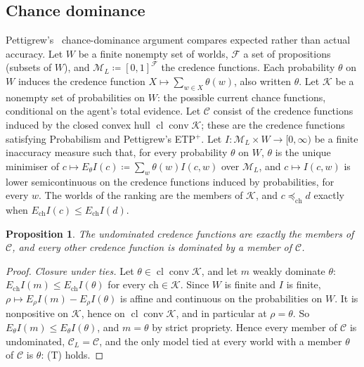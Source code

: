 \documentclass[11pt]{article}
\newtheorem{proposition}[theorem]{Proposition}
\theoremstyle{definition}
\newcommand{\M}{\mathcal M}
\newcommand{\C}{\mathcal C}
\begin{document}
{\color{red}
\subsection{Chance dominance}\label{sec:chance}
Pettigrew's~\cite[Chapter~10]{Pettigrew2016} chance-dominance argument compares expected rather than actual accuracy. Let $W$ be a finite nonempty set of worlds, $\mathcal F$ a set of propositions (subsets of $W$), and $\M_L\coloneqq[0,1]^{\mathcal F}$ the credence functions. Each probability $\theta$ on $W$ induces the credence function $X\mapsto\sum_{w\in X}\theta(w)$, also written $\theta$. Let $\mathcal K$ be a nonempty set of probabilities on $W$: the possible current chance functions, conditional on the agent's total evidence. Let $\C$ consist of the credence functions induced by the closed convex hull $\operatorname{cl}\operatorname{conv}\mathcal K$; these are the credence functions satisfying Probabilism and Pettigrew's ETP$^+$. Let $I:\M_L\times W\to[0,\infty)$ be a finite inaccuracy measure such that, for every probability $\theta$ on $W$, $\theta$ is the unique minimiser of $c\mapsto E_\theta I(c)\coloneqq\sum_w\theta(w)I(c,w)$ over $\M_L$, and $c\mapsto I(c,w)$ is lower semicontinuous on the credence functions induced by probabilities, for every $w$. The worlds of the ranking are the members of $\mathcal K$, and $c\preceq_{\mathrm{ch}}d$ exactly when $E_{\mathrm{ch}}I(c)\le E_{\mathrm{ch}}I(d)$.
\begin{proposition}\label{prop:short-chance}
The undominated credence functions are exactly the members of $\C$, and every other credence function is dominated by a member of $\C$.
\end{proposition}
\begin{proof}
\emph{Closure under ties.} Let $\theta\in\operatorname{cl}\operatorname{conv}\mathcal K$, and let $m$ weakly dominate $\theta$: $E_{\mathrm{ch}}I(m)\le E_{\mathrm{ch}}I(\theta)$ for every $\mathrm{ch}\in\mathcal K$. Since $W$ is finite and $I$ is finite, $\rho\mapsto E_\rho I(m)-E_\rho I(\theta)$ is affine and continuous on the probabilities on $W$. It is nonpositive on $\mathcal K$, hence on $\operatorname{cl}\operatorname{conv}\mathcal K$, and in particular at $\rho=\theta$. So $E_\theta I(m)\le E_\theta I(\theta)$, and $m=\theta$ by strict propriety. Hence every member of $\C$ is undominated, $\C_L=\C$, and the only model tied at every world with a member $\theta$ of $\C$ is $\theta$: (T) holds.


\end{proof}}
\end{document}
